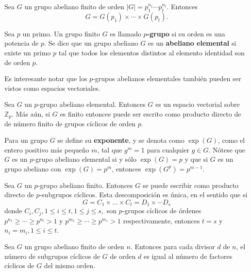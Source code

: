 \begin{lema}
Sea $G$ un grupo abeliano finito de orden $\mid G \mid = p_1^{n_1}\cdots p_t^{n_t}$. Entonces \[ G = G(p_1)\times \cdots \times G(p_t). \]
\end{lema}
\begin{definicion}
Sea $p$ un primo. Un grupo finito $G$ es llamado \textbf{$p$-grupo} si su orden es una potencia de $p$.
Se dice que un grupo abeliano $G$ es un \textbf{abeliano elemental} si existe un primo $p$ tal que todos los elementos distintos al elemento identidad son de orden $p$.
\end{definicion}
Es interesante notar que los $p$-grupos abelianos elementales también pueden ser vistos como espacios vectoriales.
\begin{lema}
Sea $G$ un $p$-grupo abeliano elemental. Entonces $G$ es un espacio vectorial sobre $\mathds{Z}_p$. Más aún, si $G$ es finito entonces puede ser escrito como producto directo de de número finito de grupos cíclicos de orden $p$.
\end{lema}
Para un grupo $G$ se define su \textbf{exponente}, y se denota como $\exp(G)$, como el entero positivo más pequeño $m$, tal que $g^m=1$ para cualquier $g \in G$. Nótese que $G$ es un $p$-grupo abeliano elemental si y sólo $\exp(G)=p$ y que si $G$ es un grupo abeliano con $\exp(G) = p^m$, entonces $\exp(G^p) = p^{m-1}$.
\begin{teorema}\label{teo:estructuraAbelianos}
Sea $G$ un $p$-grupo abeliano finito. Entonces $G$ se puede escribir como producto directo de $p$-subgrupos cíclicos. Esta descomposición es única, en el sentido que si
\[ G = C_1 \times \dots \times C_t = D_1 \times \cdots D_s \]
donde $C_i,C_j, 1\leq i \leq t, 1\leq j \leq s,$ son $p$-grupos cíclicos de órdenes $p^{n_1} \geq \cdots \geq p^{n_t}>1$ y $p^{m_1}\geq \cdots \geq p^{m_s}>1$ respectivamente, entonces $t=s$ y $n_i = m_i, 1\leq i \leq t$.
\end{teorema} 
\begin{proposicion}
Sea $G$ un grupo abeliano finito de orden $n$. Entonces para cada divisor $d$ de $n$, el número de subgrupos cíclicos de $G$ de orden $d$ es igual al número de factores cíclicos de $G$ del mismo orden.
\end{proposicion}

